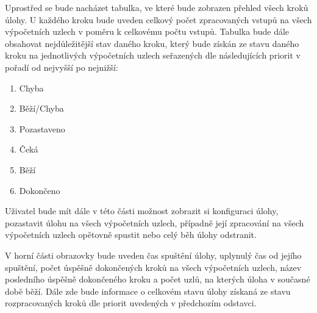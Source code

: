 Uprostřed se bude nacházet tabulka, ve které bude zobrazen přehled všech kroků úlohy. U každého kroku bude uveden celkový počet zpracovaných vstupů na všech výpočetních uzlech v poměru k celkovému počtu vstupů. Tabulka bude dále obsahovat nejdůležitější stav daného kroku, který bude získán ze stavu daného kroku na jednotlivých výpočetních uzlech seřazených dle následujících priorit v pořadí od nejvyšší po nejnižší:
\begin{enumerate}
    \item Chyba
    \item Běží/Chyba
    \item Pozastaveno
    \item Čeká
    \item Běží
    \item Dokončeno
\end{enumerate}
Uživatel bude mít dále v této části možnost zobrazit si konfiguraci úlohy, pozastavit úlohu na všech výpočetních uzlech, případně její zpracování na všech výpočetních uzlech opětovně spustit nebo celý běh úlohy odstranit.

V horní části obrazovky bude uveden čas spuštění úlohy, uplynulý čas od jejího spuštění, počet úspěšně dokončených kroků na všech výpočetních uzlech, název posledního úspěšně dokončeného kroku a počet uzlů, na kterých úloha v současné době běží. Dále zde bude informace o celkovém stavu úlohy získaná ze stavu rozpracovaných kroků dle priorit uvedených v předchozím odstavci.

